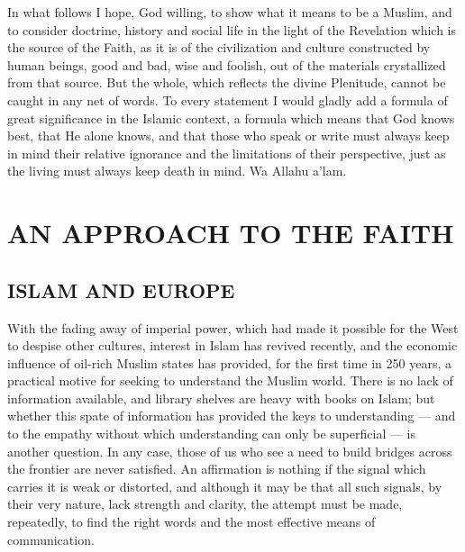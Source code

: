 \documentclass[10pt, twoside,openright]{book}
\begin{document}
In what follows I hope, God willing, to show what it means to be a Muslim, and to consider doctrine, history and social life in the light of the Revelation which is the source of the Faith, as it is of the civilization and culture constructed by human beings, good and bad, wise and foolish, out of the materials crystallized from that source. But the whole, which reflects the divine Plenitude, cannot be caught in any net of words. To every statement I would gladly add a formula of great significance in the Islamic context, a formula which means that God knows best, that He alone knows, and that those who speak or write must always keep in mind their relative ignorance and the limitations of their perspective, just as the living must always keep death in mind. Wa Allahu a'lam. \\



\part{AN APPROACH TO THE FAITH}

\chapter{ISLAM AND EUROPE}

With the fading away of imperial power, which had made it possible for the West to despise other cultures, interest in Islam has revived recently, and the economic influence of oil\hyp{}rich Muslim states has provided, for the first time in 250 years, a practical motive for seeking to understand the Muslim world. There is no lack of information available, and library shelves are heavy with books on Islam; but whether this spate of information has provided the keys to understanding --- and to the empathy without which understanding can only be superficial --- is another question. In any case, those of us who see a need to build bridges across the frontier are never satisfied. An affirmation is nothing if the signal which carries it is weak or distorted, and although it may be that all such signals, by their very nature, lack strength and clarity, the attempt must be made, repeatedly, to find the right words and the most effective means of communication. \\
\end{document}

